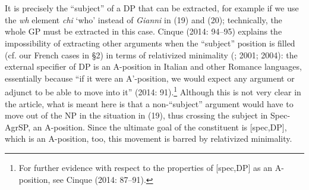 \documentclass[output=paper]{langsci/langscibook}
\begin{document}
\ea%
    \label{ex:key:20}
    \gll\\
        \\
    \glt
    \z

        

    
 

It is precisely the “subject” of a DP that can be extracted, for example if we use the \textit{wh} element \textit{chi} ‘who’ instead of \textit{Gianni} in (19) and (20); technically, the whole GP must be extracted in this case. Cinque (2014: 94–95) explains the impossibility of extracting other arguments when the “subject” position is filled (cf. our French cases in §2) in terms of relativized minimality (\citealt{Rizzi1990}; 2001; 2004): the external specifier of DP is an A-position in Italian and other Romance languages, essentially because “if it were an A’-position, we would expect any argument or adjunct to be able to move into it” (2014: 91).\footnote{For further evidence with respect to the properties of [spec,DP] as an A-position, see Cinque (2014: 87–91).} Although this is not very clear in the article, what is meant here is that a non-“subject” argument would have to move out of the NP in the situation in (19), thus crossing the subject in Spec-AgrSP, an A-position. Since the ultimate goal of the constituent is [spec,DP], which is an A-position, too, this movement is barred by relativized minimality.
\end{document}
